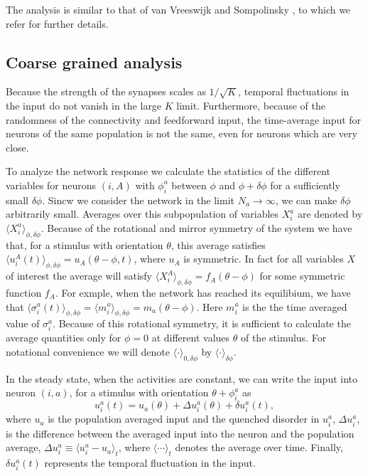 The analysis is similar to that of van Vreeswijk and Sompolinsky 
\cite{vanVreeswijk2005}, to which we refer for further details.
 
\subsection{Coarse grained analysis}
Because the strength of the synapses scales as $1/\sqrt{K}$, temporal 
fluctuations in the input do not vanish in the large $K$ limit. 
Furthermore, because  of the randomness of the connectivity and feedforward 
input, the time-average input for neurons of the same population is not the 
same, even for neurons which are very close. 
 
To analyze the network response we calculate the statistics of the different
variables for neurons $(i,A)$ with $\phi_i^a$ between $\phi$ and
$\phi+\delta\phi$ for a sufficiently small $\delta\phi$\@. Sincw we consider
the network in the limit $N_a\rightarrow \infty$, we can make $\delta\phi$ 
arbitrarily small.
Averages over this subpopulation of variables $X_i^a$ are denoted by
$\langle X_i^a\rangle_{\phi,\delta\phi}$\@. Because of the 
rotational and mirror symmetry of the system we have that, for a stimulus with 
orientation $\theta$, this average satisfies 
$\langle u_i^A(t)\rangle_{\phi,\delta\phi}=u_A(\theta-\phi,t)$, where $u_A$ is 
symmetric. In fact for all variables $X$ of interest the average will satisfy $\langle X_i^A \rangle_{\phi,\delta \phi}=f_A
(\theta-\phi)$ for some symmetric function $f_A$. For exmple, when the network has reached its equilibium, we have that
$\langle\sigma_i^a(t)\rangle_{\phi,\delta\phi}=
\langle m_i^a\rangle_{\phi,\delta\phi}=m_a(\theta-\phi)$\@. Here $m_i^a$ is the
the time averaged value of $\sigma_i^a$\@. Because of this rotational symmetry,
it is sufficient to calculate the average quantities only for $\phi=0$ at 
different values $\theta$ of the stimulus. For notational convenience we will 
denote $\langle \cdot \rangle_{0,\delta \phi}$ by 
$\langle \cdot \rangle_{\delta \phi}$\@.

In the steady state, when the activities are constant, we can write the input 
into neuron $(i,a)$, for a stimulus with orientation $\theta+\phi_i^a$ as
\begin{equation}
u_i^a(t)=u_{a}(\theta)+\Delta u_i^{a}(\theta)+\delta u_i^{a}(t),
\label{input_terms:eq}
\end{equation}
where $u_{a}$ is the population averaged input and the quenched disorder in 
$u_i^a$, $\Delta u_i^{a}$, is the
difference between the averaged input into the neuron and the population 
average, $\Delta u_i^{a}\equiv \langle u_i^a-u_a\rangle_t$, where
$\langle\cdots\rangle_t$ denotes the average over time.
Finally, $\delta u_i^{a}(t)$ represents the temporal fluctuation in the input.

